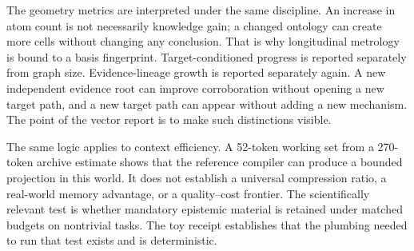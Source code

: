 The geometry metrics are interpreted under the same discipline. An increase in atom count is not necessarily knowledge gain; a changed ontology can create more cells without changing any conclusion. That is why longitudinal metrology is bound to a basis fingerprint. Target-conditioned progress is reported separately from graph size. Evidence-lineage growth is reported separately again. A new independent evidence root can improve corroboration without opening a new target path, and a new target path can appear without adding a new mechanism. The point of the vector report is to make such distinctions visible.

The same logic applies to context efficiency. A 52-token working set from a 270-token archive estimate shows that the reference compiler can produce a bounded projection in this world. It does not establish a universal compression ratio, a real-world memory advantage, or a quality--cost frontier. The scientifically relevant test is whether mandatory epistemic material is retained under matched budgets on nontrivial tasks. The toy receipt establishes that the plumbing needed to run that test exists and is deterministic.
